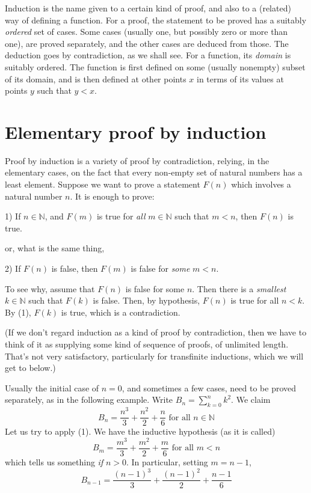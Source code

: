 \documentclass[12pt]{article}
\begin{document}
Induction is the name given to a certain kind of proof, and also to
a (related) way of defining a function.
For a proof, the statement to
be proved has a suitably \emph{ordered} set of cases.
Some cases (usually one, but possibly zero or more than one), are proved
separately, and the other cases are deduced from those.
The deduction goes by contradiction, as we shall see.
For a function, its \emph{domain} is suitably ordered.
The function is first defined on some (usually nonempty)
subset of its domain, and is then defined at other points
$x$ in terms of its values at points $y$ such that $y<x$.

\section{Elementary proof by induction}
Proof by induction is a variety of proof by contradiction, relying,
in the elementary cases, on the fact that every non-empty set of
natural numbers has a least element.
Suppose we want to prove a statement $F(n)$ which involves a natural
number $n$.
It is enough to prove:

1) If $n\in\mathbb{N}$, and $F(m)$ is true for \emph{all}
$m\in\mathbb{N}$ such that $m<n$, then $F(n)$ is true.

or, what is the same thing,

2) If $F(n)$ is false, then $F(m)$ is false for \emph{some} $m<n$.

To see why, assume that $F(n)$ is false for some $n$.
Then there is a \emph{smallest} $k \in {\mathbb N}$
such that $F(k)$ is false.
Then, by hypothesis, $F(n)$ is true for all $n<k$.
By (1), $F(k)$ is true, which is a contradiction.

(If we don't regard induction as a kind of proof by contradiction, then we
have to think of it as supplying some kind of sequence of proofs, of
unlimited length.
That's not very satisfactory, particularly for transfinite
inductions, which we will get to below.)

Usually the initial case of $n=0$, and sometimes a few cases, need
to be proved separately, as in the following example.
Write $B_n=\sum_{k=0}^n k^2$.
We claim
$$B_n=\frac{n^3}{3} + \frac{n^2}{2}
  + \frac{n}{6} \textrm{ for all }n\in \mathbb{N}$$
Let us try to apply (1). We have the inductive hypothesis (as it is called)
$$B_m=
\frac{m^3}{3} + \frac{m^2}{2} + \frac{m}{6} \textrm{ for all }m<n$$
which tells us something \emph{if} $n>0$. In particular, setting $m=n-1$,
$$B_{n-1}=\frac{(n-1)^3}{3} + \frac{(n-1)^2}{2} + \frac{n-1}{6}$$
\end{document}
